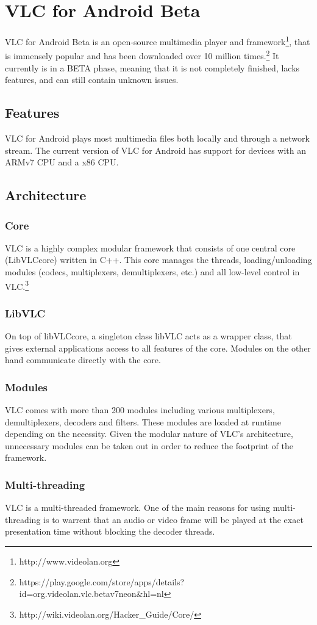 \section{VLC for Android Beta}
VLC for Android Beta is an open-source multimedia player and framework\footnote{http://www.videolan.org}, that is immensely popular and has been downloaded over 10 million times.\footnote{https://play.google.com/store/apps/details?id=org.videolan.vlc.betav7neon\&hl=nl} It currently is in a BETA phase, meaning that it is not completely finished, lacks features, and can still contain unknown issues. 
\subsection{Features}
VLC for Android plays most multimedia files both locally and through a network stream. The current version of VLC for Android has support for devices with an ARMv7 CPU and a x86 CPU.
\subsection{Architecture}
\subsubsection{Core}
VLC is a highly complex modular framework that consists of one central core (LibVLCcore) written in C++. This core manages the threads, loading/unloading modules (codecs, multiplexers, demultiplexers, etc.) and all low-level control in VLC.\footnote{http://wiki.videolan.org/Hacker\_Guide/Core/}
\subsubsection{LibVLC}
On top of libVLCcore, a singleton class libVLC acts as a wrapper class, that gives external applications access to all features of the core. Modules on the other hand communicate directly with the core.
\subsubsection{Modules}
VLC comes with more than 200 modules including various multiplexers, demultiplexers, decoders and filters. These modules are loaded at runtime depending on the necessity. Given the modular nature of VLC's architecture, unnecessary modules can be taken out in order to reduce the footprint of the framework.
\subsubsection{Multi-threading}
VLC is a multi-threaded framework. One of the main reasons for using multi-threading is to warrent that an audio or video frame will be played at the exact presentation time without blocking the decoder threads.


